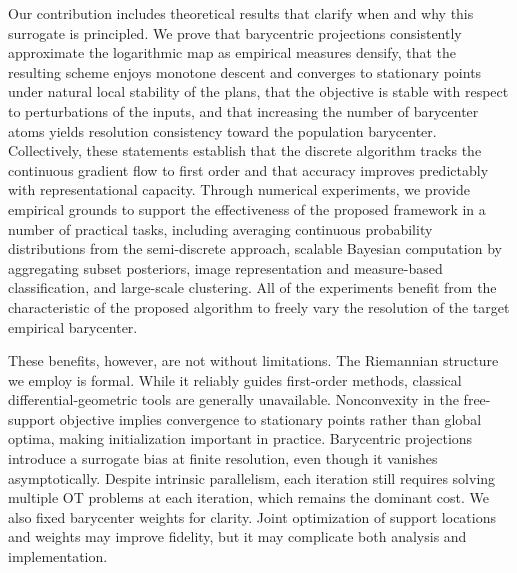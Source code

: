\documentclass[11pt]{article}
\begin{document}
Our contribution includes theoretical results that clarify when and why this surrogate is principled. We prove that barycentric projections consistently approximate the logarithmic map as empirical measures densify, that the resulting scheme enjoys monotone descent and converges to stationary points under natural local stability of the plans, that the objective is stable with respect to perturbations of the inputs, and that increasing the number of barycenter atoms yields resolution consistency toward the population barycenter. Collectively, these statements establish that the discrete algorithm tracks the continuous gradient flow to first order and that accuracy improves predictably with representational capacity. Through numerical experiments, we provide empirical grounds to support the effectiveness of the proposed framework in a number of practical tasks, including averaging continuous probability distributions from the semi-discrete approach, scalable Bayesian computation by aggregating subset posteriors, image representation and measure-based classification, and large-scale clustering. All of the experiments benefit from the characteristic of the proposed algorithm to freely vary the resolution of the target empirical barycenter.


These benefits, however, are not without limitations. The Riemannian structure we employ is formal. While it reliably guides first-order methods, classical differential-geometric tools are generally unavailable. Nonconvexity in the free-support objective implies convergence to stationary points rather than global optima, making initialization important in practice. Barycentric projections introduce a surrogate bias at finite resolution, even though it vanishes asymptotically. Despite intrinsic parallelism, each iteration still requires solving multiple OT problems at each iteration, which remains the dominant cost. We also fixed barycenter weights for clarity. Joint optimization of support locations and weights may improve fidelity, but it may complicate both analysis and implementation.
\end{document}
